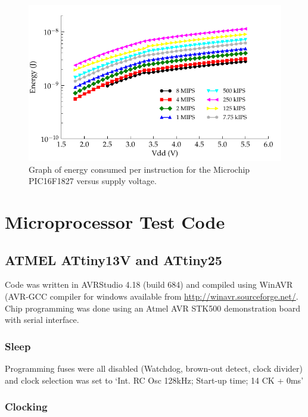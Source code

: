 \begin{figure}
  \centering
  \includegraphics{content/appendices/microprocessorPowerMeasurements/graphics/Graph_PIC16F1827_Clock_JPI}
  \caption{
  \label{fig:16F1827ClkJPI}Graph of energy consumed per instruction for the Microchip PIC16F1827 versus supply voltage.}
\end{figure}


\section{Microprocessor Test Code}

\subsection*{ATMEL ATtiny13V and ATtiny25}

Code was written in AVRStudio 4.18 (build 684) and compiled using
WinAVR (AVR-GCC compiler for windows available from \url{http://winavr.sourceforge.net/}.
Chip programming was done using an Atmel AVR STK500 demonstration
board with serial interface.


\subsubsection*{Sleep}

Programming fuses were all disabled (Watchdog, brown-out detect, clock
divider) and clock selection was set to `Int. RC Osc 128kHz; Start-up
time; 14 CK + 0ms'




\subsubsection*{Clocking}

